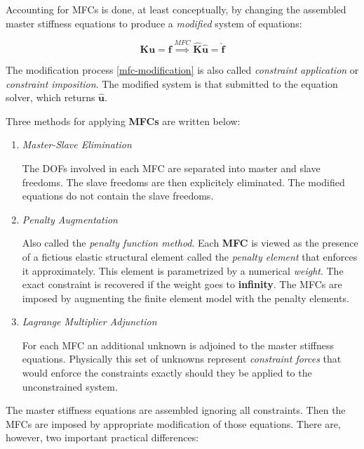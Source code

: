 \documentclass[10pt,b5paper,titlepage]{book}
\newcommand{\m}{\mathbf}
\begin{document}
Accounting for MFCs is done, at least conceptually, by changing the assembled master
stiffness equations to produce a \textit{modified} system of equations:

\begin{equation}\label{mfc-modification}
    \m{K} \m{u} = \m{f} \overset{MFC}{\implies}
    \hat{\m{K}} \hat{\m{u}} = \hat{\m{f}}
\end{equation}

The modification process \eqref{mfc-modification} is also called  \textit{constraint}
\textit{application} or \textit{constraint imposition}. The modified system
is that submitted to the equation solver, which returns $ \hat{\m{u}} $.

Three methods for applying \textbf{MFCs} are written below:

\begin{enumerate}
    \item \textit{Master-Slave Elimination}

        The DOFs involved in each MFC are separated into master and slave freedoms.
        The slave freedoms are then explicitely eliminated. The modified equations
        do not contain the slave freedoms.

    \item \textit{Penalty Augmentation}

        Also called the \textit{penalty function method}. Each \textbf{MFC}
        is viewed as the presence of a fictious elastic structural element called
        the \textit{penalty element} that enforces it approximately. This element
        is parametrized by a numerical \textit{weight}. The exact constraint is
        recovered if the weight goes to \textbf{infinity}. The MFCs are imposed
        by augmenting the finite element model with the penalty elements.

    \item \textit{Lagrange Multiplier Adjunction}

        For each MFC an additional unknown is adjoined to the master stiffness
        equations. Physically this set of unknowns represent
        \textit{constraint forces} that would enforce the constraints exactly
        should they be applied to the unconstrained system.
\end{enumerate}

The master stiffness equations are assembled ignoring all constraints. Then the MFCs
are imposed by appropriate modification of those equations. There are, however,
two important practical differences:
\end{document}

